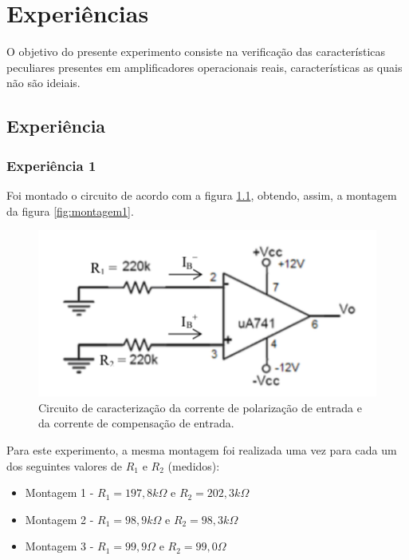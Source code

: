 \documentclass{abntex2}
\begin{document}
\imprimircapa
\imprimirfolhaderosto

\tableofcontents
\clearpage
\listoffigures
\listoftables
\clearpage


\chapter{Experiências}

 O objetivo do presente experimento consiste na verificação das características peculiares presentes
 em amplificadores operacionais reais, características as quais não são ideiais.

\section{Experiência}
\subsection{Experiência 1}

Foi montado o circuito de acordo com a figura \ref{fig:circuito1}, obtendo, assim, a montagem da figura \ref{fig:montagem1}.
\begin{figure}[h]
  \centering
  \includegraphics[scale = 0.5]{exp1.png}
  \caption{Circuito de caracterização da corrente de polarização de entrada e da corrente de compensação de entrada.}
  \label{fig:circuito1}
\end{figure}

Para este experimento, a mesma montagem foi realizada uma vez para cada um dos seguintes valores de $R_1$ e $R_2$ (medidos):
\begin{itemize}
  \item Montagem 1 - $R_1 = 197,8k\Omega$ e $R_2 = 202,3k\Omega$
  \item Montagem 2 - $R_1 = 98,9k\Omega$ e $R_2 = 98,3k\Omega$
  \item Montagem 3 - $R_1 = 99,9\Omega$ e $R_2 = 99,0\Omega$
\end{itemize}
\end{document}
